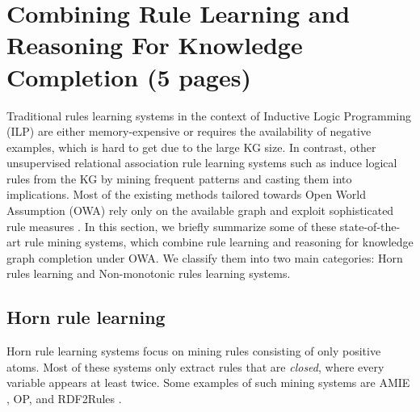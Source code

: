 \section{Combining Rule Learning and Reasoning For Knowledge Completion (5 pages)}
\label{sec:rules_kg_completion}
Traditional rules learning systems in the context of Inductive Logic Programming (ILP) \cite{probfoil,DBLP:conf/ijcai/RaedtDTBV15,DBLP:conf/clima/CorapiSIR11} are either memory-expensive or requires the availability of negative examples, which is hard to get due to the large KG size. In contrast, other unsupervised relational 
association rule learning systems such as \cite{DBLP:conf/esf/GoethalsB02,amie} induce logical rules from the KG by mining frequent patterns and casting them into implications. Most of the  existing methods tailored towards Open World Assumption (OWA) rely only on the available graph and exploit sophisticated rule measures \cite{amie,Chen:2016:OP:2882903.2882954, rumis}.
In this section, we briefly summarize some of these state-of-the-art rule mining systems, which combine rule learning and reasoning for knowledge graph completion under OWA. We classify them into two main categories: Horn rules learning and Non-monotonic rules learning systems.
\subsection{Horn rule learning}
Horn rule learning systems focus on mining rules consisting of only positive atoms. Most of these systems only extract rules that are \emph{closed}, where every variable appears at least twice. Some examples of such mining systems are AMIE \cite{}, OP, \cite{} and RDF2Rules \cite{}.
